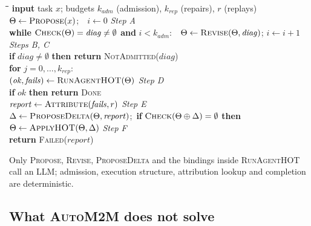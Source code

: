 \documentclass[10pt,a4paper]{article}
\newcommand{\auto}{\textsc{AutoM2M}}
\newcommand{\Team}{\Theta}
\begin{document}
\begin{center}
\begin{minipage}{0.92\linewidth}
\begin{tcolorbox}[enhanced, colback=white, colframe=black!25, arc=0pt, boxrule=0.5pt,
  left=6pt, right=6pt, top=4pt, bottom=4pt, title={\sffamily\small Algorithm 1: the \auto{} loop}, 
  coltitle=black, colbacktitle=black!6, fonttitle=\bfseries]
\small
\begin{tabbing}
\quad\=\quad\=\quad\=\kill
\textbf{input} task $x$; budgets $k_{\mathit{adm}}$ (admission), $k_{\mathit{rep}}$ (repairs), $r$ (replays)\\
$\Team \gets \textsc{Propose}(x)$;\ \ $i\gets 0$ \hfill \textit{Step A}\\
\textbf{while} $\textsc{Check}(\Team)=\mathit{diag}\neq\emptyset$ \textbf{and} $i<k_{\mathit{adm}}$:\ \ $\Team\gets\textsc{Revise}(\Team,\mathit{diag})$; $i\gets i+1$ \hfill \textit{Steps B, C}\\
\textbf{if} $\mathit{diag}\neq\emptyset$ \textbf{then return} \textsc{NotAdmitted}($\mathit{diag}$)\\
\textbf{for} $j=0,\dots,k_{\mathit{rep}}$:\\
\>$(\mathit{ok},\mathit{fails})\gets\textsc{RunAgentHOT}(\Team)$ \hfill \textit{Step D}\\
\>\textbf{if} $\mathit{ok}$ \textbf{then return} \textsc{Done}\\
\>$\mathit{report}\gets\textsc{Attribute}(\mathit{fails},r)$ \hfill \textit{Step E}\\
\>$\Delta\gets\textsc{ProposeDelta}(\Team,\mathit{report})$;\ \textbf{if} $\textsc{Check}(\Team\oplus\Delta)=\emptyset$ \textbf{then} $\Team\gets\textsc{ApplyHOT}(\Team,\Delta)$ \hfill \textit{Step F}\\
\textbf{return} \textsc{Failed}($\mathit{report}$)
\end{tabbing}
\end{tcolorbox}
\end{minipage}
\end{center}
\label{alg:auto}
{\small Only \textsc{Propose}, \textsc{Revise}, \textsc{ProposeDelta} and the
bindings inside \textsc{RunAgentHOT} call an LLM; admission, execution
structure, attribution lookup and completion are deterministic.}


\subsection{What \auto{} does not solve}\label{sec:limits-design}
\end{document}
